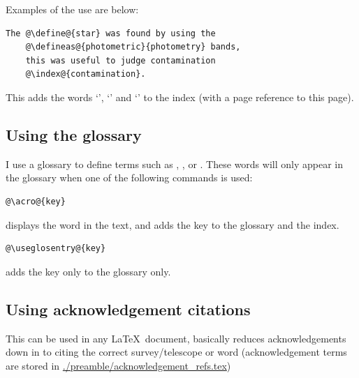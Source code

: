     Examples of the use are below: 

    \begin{lstlisting}[style=base]
    The @\define@{star} was found by using the 
    @\defineas@{photometric}{photometry} bands, 
    this was useful to judge contamination 
    @\index@{contamination}.
    \end{lstlisting}

    This adds the words `', `' and `' to the index (with a page reference to this page).

\subsection{Using the glossary}
    \label{ch1_section_using_glossary}

    I use a glossary to define terms such as , ,  or .
    These words will only appear in the glossary when one of the following commands is used:

    \begin{lstlisting}[style=base]
    @\acro@{key}
    \end{lstlisting}

    displays the word in the text, and adds the key to the glossary and the index.

    \begin{lstlisting}[style=base]
    @\useglosentry@{key}
    \end{lstlisting} 

    adds the key only to the glossary only.


\subsection{Using acknowledgement citations}
    \label{ch1_section_using_acknowledgement_citations}

    This can be used in any \LaTeX \, document, basically reduces acknowledgements down in to citing the correct survey/telescope or word (acknowledgement terms are stored in \url{./preamble/acknowledgement_refs.tex})

